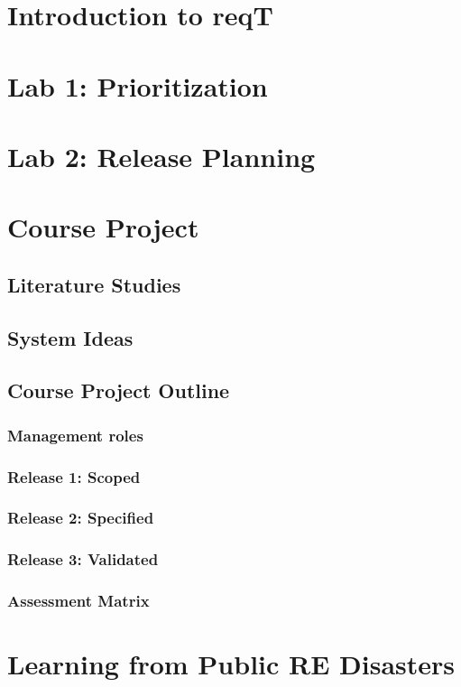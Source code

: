 \documentclass{reqengbook}
\begin{document}
\chapter{Introduction to reqT}

\chapter{Lab 1: Prioritization}

\chapter{Lab 2: Release Planning}

\chapter{Course Project}

\section{Literature Studies}

\section{System Ideas}

\section{Course Project Outline}
\subsection{Management roles}
\subsection{Release 1: Scoped}
\subsection{Release 2: Specified}
\subsection{Release 3: Validated}
\subsection{Assessment Matrix}


\chapter{Learning from Public RE Disasters}
\end{document}
